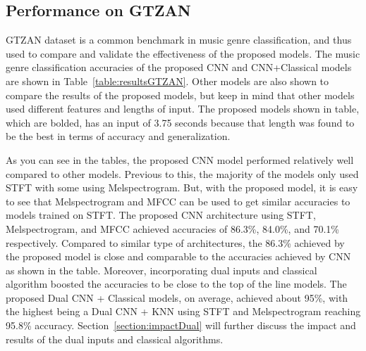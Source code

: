 \documentclass[10pt,twocolumn,letterpaper]{article}
\begin{document}
	\subsection{Performance on GTZAN} %
	
	GTZAN dataset is a common benchmark in music genre classification, and thus used to compare and validate the effectiveness of the proposed models. The music genre classification accuracies of the proposed CNN and CNN+Classical models are shown in Table~\ref{table:resultsGTZAN}. Other models are also shown to compare the results of the proposed models, but keep in mind that other models used different features and lengths of input. The proposed models shown in table, which are bolded, has an input of 3.75 seconds because that length was found to be the best in terms of accuracy and generalization. 
	
	As you can see in the tables, the proposed CNN model performed relatively well compared to other models. Previous to this, the majority of the models only used STFT with some using Melspectrogram. But, with the proposed model, it is easy to see that Melspectrogram and MFCC can be used to get similar accuracies to models trained on STFT. The proposed CNN architecture using STFT, Melspectrogram, and MFCC achieved accuracies of 86.3\%, 84.0\%, and 70.1\% respectively. Compared to similar type of architectures, the 86.3\% achieved by the proposed model is close and comparable to the accuracies achieved by CNN~\cite{yang2020parallel} as shown in the table. Moreover, incorporating dual inputs and classical algorithm boosted the accuracies to be close to the top of the line models. The proposed Dual CNN + Classical models, on average, achieved about 95\%, with the highest being a Dual CNN + KNN using STFT and Melspectrogram reaching 95.8\% accuracy. Section~\ref{section:impactDual} will further discuss the impact and results of the dual inputs and classical algorithms.
	
\end{document}
